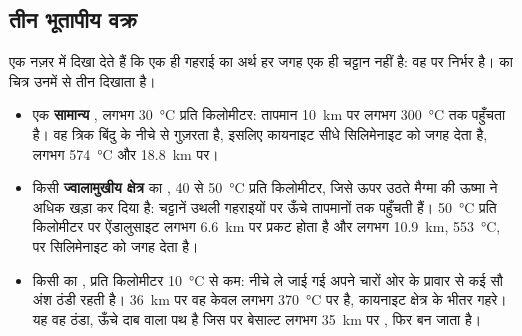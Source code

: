 \subsection{तीन भूतापीय वक्र}

 एक नज़र में दिखा देते हैं कि एक ही गहराई का अर्थ हर जगह एक ही
चट्टान नहीं है: वह  पर निर्भर है।  का चित्र
उनमें से तीन दिखाता है।

\begin{itemize}
  \item एक \textbf{सामान्य} , लगभग \qty{30}{\celsius} प्रति
        किलोमीटर: तापमान \qty{10}{km} पर लगभग \qty{300}{\celsius} तक
        पहुँचता है। वह त्रिक बिंदु के नीचे से गुज़रता है, इसलिए कायनाइट
        सीधे सिलिमेनाइट को जगह देता है, लगभग \qty{574}{\celsius} और
        \qty{18.8}{km} पर।
  \item किसी \textbf{ज्वालामुखीय क्षेत्र} का , 40 से \qty{50}{\celsius} प्रति
        किलोमीटर, जिसे ऊपर उठते मैग्मा की ऊष्मा ने अधिक खड़ा कर दिया है: चट्टानें
        उथली गहराइयों पर ऊँचे तापमानों तक पहुँचती हैं। \qty{50}{\celsius} प्रति
        किलोमीटर पर ऐंडालुसाइट लगभग \qty{6.6}{km} पर प्रकट होता है और
        लगभग \qty{10.9}{km}, \qty{553}{\celsius}, पर सिलिमेनाइट को जगह देता है।
  \item किसी \textbf{} का , प्रति किलोमीटर
        \qty{10}{\celsius} से कम: नीचे ले जाई गई 
        अपने चारों ओर के प्रावार से कई सौ अंश ठंडी रहती है।
        \qty{36}{km} पर वह केवल लगभग \qty{370}{\celsius} पर है, कायनाइट
        क्षेत्र के भीतर गहरे। यह वह ठंडा, ऊँचे दाब वाला पथ है जिस पर बेसाल्ट
        लगभग \qty{35}{km} पर , फिर  बन जाता है।
\end{itemize}

